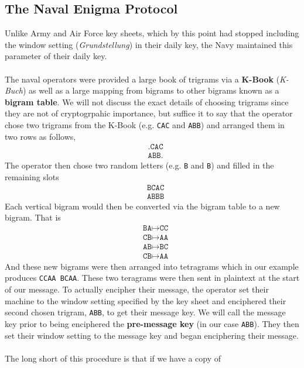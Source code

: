 \subsection{The Naval Enigma Protocol}
Unlike Army and Air Force key sheets, which by this point had stopped
including the window setting (\emph{Grundstellung}) in their daily
key, the Navy maintained this parameter of their daily key.
\\\\The naval operators were provided a large book of trigrams via a
{\bf{{K-Book}}} (\emph{K-Buch}) as well as a large mapping from
bigrams to other bigrams known as a {\bf{bigram table}}. We will not
discuss the exact details of choosing trigrams since they are not of
cryptogrpahic importance, but suffice it to say that the operator
chose two trigrams from the K-Book (e.g. \texttt{CAC} and
\texttt{ABB}) and arranged them in two rows as follows,
\begin{align*}
  & \texttt{.CAC} \\
  & \texttt{ABB.}
\end{align*}
The operator then chose two random letters (e.g. \texttt{B} and
\texttt{B}) and filled in the remaining slots
\begin{align*}
  & \texttt{BCAC} \\
  & \texttt{ABBB}
\end{align*}
Each vertical bigram would then be converted via the bigram table to
a new bigram. That is
\begin{align*}
  & \texttt{BA} \mapsto \texttt{CC} \\
  & \texttt{CB} \mapsto \texttt{AA} \\
  & \texttt{AB} \mapsto \texttt{BC} \\
  & \texttt{CB} \mapsto \texttt{AA}
\end{align*}
And these new bigrams were then arranged into tetragrams which in our
example produces \texttt{CCAA BCAA}. These two teragrams were then
sent in plaintext at the start of our message. To actually encipher
their message, the operator set their machine to the window setting
specified by the key sheet and enciphered their second chosen trigram, \texttt{ABB}, to get their message key. We will call the message
  key prior to being enciphered the {\bf{pre-message key}} (in our
  case \texttt{ABB}). They then set their window setting to the
  message key and began enciphering their message.
  \\\\The long short of this procedure is that if we have a copy of
